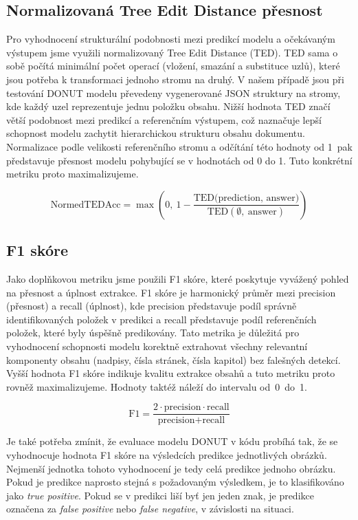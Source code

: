 \documentclass{article}
\begin{document}
\subsection{Normalizovaná Tree Edit Distance přesnost}
Pro vyhodnocení strukturální podobnosti mezi predikcí modelu a očekávaným výstupem jsme využili normalizovaný Tree Edit Distance (TED). TED sama o sobě počítá minimální počet operací (vložení, smazání a substituce uzlů), které jsou potřeba k transformaci jednoho stromu na druhý. V našem případě jsou při testování DONUT modelu převedeny vygenerované JSON struktury na stromy, kde každý uzel reprezentuje jednu položku obsahu. Nižší hodnota TED značí větší podobnost mezi predikcí a referenčním výstupem, což naznačuje lepší schopnost modelu zachytit hierarchickou strukturu obsahu dokumentu. Normalizace podle velikosti referenčního stromu a odčítání této hodnoty od 1~pak představuje přesnost modelu pohybující se v hodnotách od 0 do 1. Tuto konkrétní metriku proto maximalizujeme.

\[
\text{NormedTEDAcc} = \max\left(0,\ 1 - \frac{\text{TED(prediction, answer)}}{\text{TED}(\emptyset,\ \text{answer})}\right)
\]

\subsection{F1 skóre}
\label{f1}
Jako doplňkovou metriku jsme použili F1 skóre, které poskytuje vyvážený pohled na přesnost a úplnost extrakce. F1 skóre je harmonický průměr mezi precision (přesnost) a recall (úplnost), kde precision představuje podíl správně identifikovaných položek v predikci a recall představuje podíl referenčních položek, které byly úspěšně predikovány. Tato metrika je důležitá pro vyhodnocení schopnosti modelu korektně extrahovat všechny relevantní komponenty obsahu (nadpisy, čísla stránek, čísla kapitol) bez falešných detekcí. Vyšší hodnota F1 skóre indikuje kvalitu extrakce obsahů a tuto metriku proto rovněž maximalizujeme. Hodnoty taktéž náleží do intervalu od~0~do~1.

\[
\text{F1} = \frac{2 \cdot \text{precision} \cdot \text{recall}}{\text{precision} + \text{recall}}
\]

Je také potřeba zmínit, že evaluace modelu DONUT v kódu probíhá tak, že se vyhodnocuje hodnota F1 skóre na výsledcích predikce jednotlivých obrázků. Nejmenší jednotka tohoto vyhodnocení je tedy celá predikce jednoho obrázku. Pokud je predikce naprosto stejná s požadovaným výsledkem, je to klasifikováno jako \textit{true positive}. Pokud se v predikci liší byť jen jeden znak, je predikce označena za \textit{false positive} nebo \textit{false negative}, v závislosti na situaci.
\end{document}
